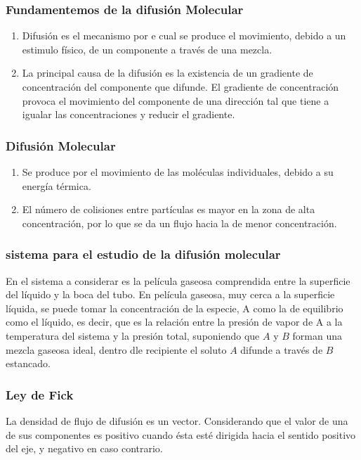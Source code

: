 \subsubsection{Fundamentemos de la difusión Molecular}
\begin{enumerate}
    \item Difusión es el mecanismo por e cual se produce el movimiento,
    debido a un estimulo físico, de un componente a través de una 
    mezcla.

    \item La principal causa de la difusión es la existencia de un gradiente de 
    concentración del componente que difunde. El gradiente de concentración provoca
    el movimiento del componente de una dirección tal que tiene a igualar las concentraciones y reducir el gradiente.
\end{enumerate}

\subsubsection{Difusión Molecular}
\begin{enumerate}
    \item Se produce por el movimiento de las moléculas individuales, debido a su energía térmica.
    \item El número de colisiones entre partículas es mayor en la zona de alta concentración, por lo que se da un flujo hacia la de menor concentración.
\end{enumerate}

\subsubsection{sistema para el estudio de la difusión molecular}
En el sistema a considerar es la película gaseosa comprendida entre la superficie del líquido y la boca
del tubo. En película gaseosa, muy cerca a la superficie líquida, se puede tomar la concentración de la especie, 
A como la de equilibrio como el líquido, es decir, 
que es la relación entre la presión de vapor de A
a la temperatura del sistema y la presión total, suponiendo
que $A$ y $B$ forman una mezcla gaseosa ideal,
dentro dle recipiente el soluto $A$ difunde a través de $B$ estancado.

\subsubsection{Ley de Fick}
La densidad de flujo de difusión es un vector. Considerando que
el valor de una de sus componentes es positivo cuando ésta esté dirigida
hacia el sentido positivo del eje, y negativo en caso contrario.

